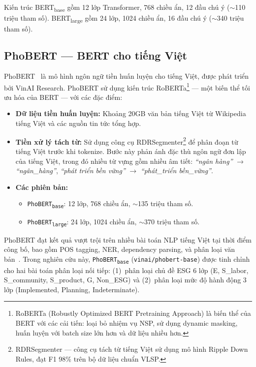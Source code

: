 Kiến trúc BERT\textsubscript{base} gồm 12 lớp Transformer, 768 chiều ẩn, 12 đầu chú ý ($\sim$110 triệu tham số). BERT\textsubscript{large} gồm 24 lớp, 1024 chiều ẩn, 16 đầu chú ý ($\sim$340 triệu tham số).


\subsection{PhoBERT --- BERT cho tiếng Việt}
\label{subsec:phobert}

PhoBERT~\cite{nguyen2020phobert} là mô hình ngôn ngữ tiền huấn luyện cho tiếng Việt, được phát triển bởi VinAI Research. PhoBERT sử dụng kiến trúc RoBERTa\footnote{RoBERTa (Robustly Optimized BERT Pretraining Approach) là biến thể của BERT với các cải tiến: loại bỏ nhiệm vụ NSP, sử dụng dynamic masking, huấn luyện với batch size lớn hơn và dữ liệu nhiều hơn.} --- một biến thể tối ưu hóa của BERT --- với các đặc điểm:

\begin{itemize}
    \item \textbf{Dữ liệu tiền huấn luyện:} Khoảng 20GB văn bản tiếng Việt từ Wikipedia tiếng Việt và các nguồn tin tức tổng hợp.
    \item \textbf{Tiền xử lý tách từ:} Sử dụng công cụ RDRSegmenter\footnote{RDRSegmenter --- công cụ tách từ tiếng Việt sử dụng mô hình Ripple Down Rules, đạt F1 98\% trên bộ dữ liệu chuẩn VLSP.} để phân đoạn từ tiếng Việt trước khi tokenize. Bước này phản ánh đặc thù ngôn ngữ đơn lập của tiếng Việt, trong đó nhiều từ vựng gồm nhiều âm tiết: \textit{``ngân hàng''} $\rightarrow$ \textit{``ngân\_hàng''}, \textit{``phát triển bền vững''} $\rightarrow$ \textit{``phát\_triển bền\_vững''}.
    \item \textbf{Các phiên bản:}
    \begin{itemize}
        \item \texttt{PhoBERT\textsubscript{base}}: 12 lớp, 768 chiều ẩn, $\sim$135 triệu tham số.
        \item \texttt{PhoBERT\textsubscript{large}}: 24 lớp, 1024 chiều ẩn, $\sim$370 triệu tham số.
    \end{itemize}
\end{itemize}

PhoBERT đạt kết quả vượt trội trên nhiều bài toán NLP tiếng Việt tại thời điểm công bố, bao gồm POS tagging, NER, dependency parsing, và phân loại văn bản~\cite{nguyen2020phobert}. Trong nghiên cứu này, \texttt{PhoBERT\textsubscript{base}} (\texttt{vinai/phobert-base}) được tinh chỉnh cho hai bài toán phân loại nối tiếp: (1)~phân loại chủ đề ESG 6 lớp (E, S\_labor, S\_community, S\_product, G, Non\_ESG) và (2)~phân loại mức độ hành động 3 lớp (Implemented, Planning, Indeterminate).


